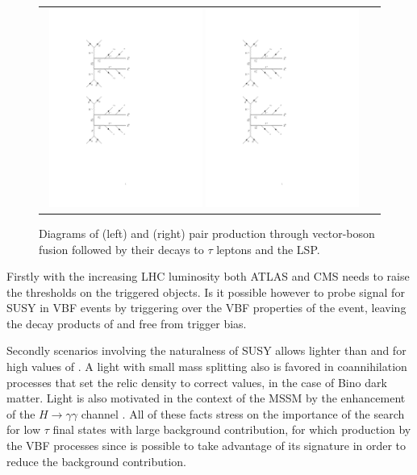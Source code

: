 \begin{figure}[tbh!]
	\centering
	\begin{tabular}{cc}
		\includegraphics[width=0.48\textwidth]{diagrams/pics/signal_C1N2.pdf}
		\includegraphics[width=0.48\textwidth]{diagrams/pics/signal_C1C1.pdf} 		
	\end{tabular}
	\caption{Diagrams of (left) \charginopm \neutralinotwo and (right) \charginopm \charginomp pair production through vector-boson fusion followed by their decays to $\tau$ leptons and the LSP.}
	\label{fig:VBF_diagrams}
\end{figure}

Firstly with the increasing LHC luminosity both ATLAS and CMS needs to raise the \pt thresholds on the triggered objects. Is it possible however to probe signal for SUSY in VBF events by triggering over the VBF properties of the event, leaving the decay products of \charginopm and \neutralinotwo free from trigger bias. 

Secondly scenarios involving the naturalness of SUSY allows \stau lighter than \smuon and \selectron for high values of \tanbeta. A light \stau with small mass splitting also is favored in coannihilation processes \cite{Griest:1990kh} that set the relic density to correct values, in the case of Bino dark matter. Light \stau is also motivated in the context of the MSSM by the enhancement of the $H \longrightarrow \gamma\gamma$ channel \cite{Carena:2011aa}. All of these facts stress on the importance of the search for low \pt $\tau$ final states with large background contribution, for which production by the VBF processes since is possible to take advantage of its signature in order to reduce the background contribution. 

